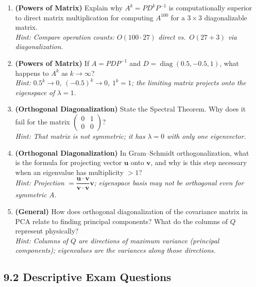 \documentclass[12pt,a4paper]{article}
\begin{document}
\begin{enumerate}[leftmargin=*, label=\textbf{V\arabic*.}]
  \item \textbf{(Powers of Matrix)} Explain why $A^k = PD^k P^{-1}$ is computationally superior to direct matrix multiplication for computing $A^{100}$ for a $3\times 3$ diagonalizable matrix. \\
  \textit{Hint: Compare operation counts: $O(100 \cdot 27)$ direct vs.\ $O(27 + 3)$ via diagonalization.}

  \item \textbf{(Powers of Matrix)} If $A = PDP^{-1}$ and $D = \operatorname{diag}(0.5, -0.5, 1)$, what happens to $A^k$ as $k \to \infty$? \\
  \textit{Hint: $0.5^k \to 0$, $(-0.5)^k \to 0$, $1^k = 1$; the limiting matrix projects onto the eigenspace of $\lambda=1$.}

  \item \textbf{(Orthogonal Diagonalization)} State the Spectral Theorem. Why does it fail for the matrix $\begin{pmatrix}0&1\\0&0\end{pmatrix}$? \\
  \textit{Hint: That matrix is not symmetric; it has $\lambda=0$ with only one eigenvector.}

  \item \textbf{(Orthogonal Diagonalization)} In Gram--Schmidt orthogonalization, what is the formula for projecting vector $\mathbf{u}$ onto $\mathbf{v}$, and why is this step necessary when an eigenvalue has multiplicity $>1$? \\
  \textit{Hint: Projection $= \dfrac{\mathbf{u}\cdot\mathbf{v}}{\mathbf{v}\cdot\mathbf{v}}\mathbf{v}$; eigenspace basis may not be orthogonal even for symmetric $A$.}

  \item \textbf{(General)} How does orthogonal diagonalization of the covariance matrix in PCA relate to finding principal components? What do the columns of $Q$ represent physically? \\
  \textit{Hint: Columns of $Q$ are directions of maximum variance (principal components); eigenvalues are the variances along those directions.}
\end{enumerate}

\subsection*{9.2 Descriptive Exam Questions}
\end{document}
